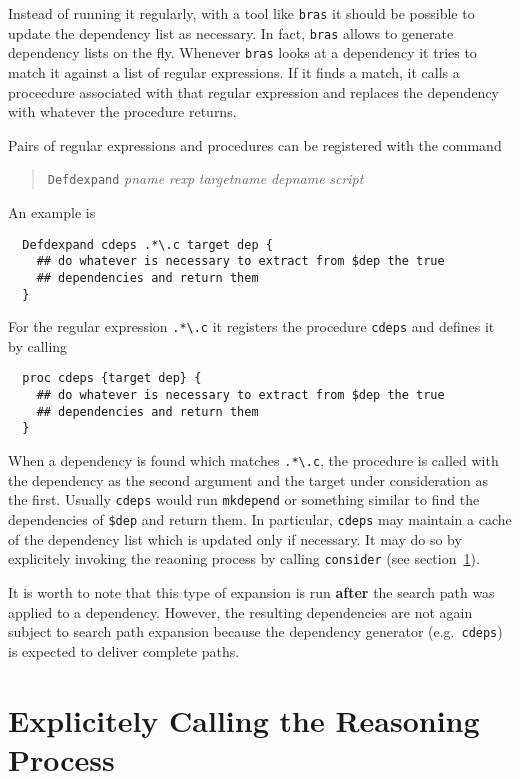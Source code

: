 \documentclass[12pt]{article}
\newcommand{\bras}{\texttt{bras}}
\begin{document}
Instead of running it regularly, with a tool like \bras{} it should be
possible to update the dependency list as necessary. In fact, \bras{}
allows to generate dependency lists on the fly. Whenever \bras{} looks
at a dependency it tries to match it against a list of regular
expressions. If it finds a match, it calls a procecdure associated with
that regular expression and replaces the dependency with whatever the
procedure returns.

Pairs of regular expressions and procedures can be registered with the
command
\begin{quote}
  \texttt{Defdexpand} \textit{pname} \textit{rexp} \textit{targetname}
\textit{depname} \textit{script}
\end{quote}
An example is
\begin{verbatim}
  Defdexpand cdeps .*\.c target dep {
    ## do whatever is necessary to extract from $dep the true
    ## dependencies and return them
  }
\end{verbatim}
For the regular expression \verb|.*\.c| it registers the procedure
\texttt{cdeps} and defines it by calling
\begin{verbatim}
  proc cdeps {target dep} {
    ## do whatever is necessary to extract from $dep the true
    ## dependencies and return them
  }
\end{verbatim}
When a dependency is found which matches \verb|.*\.c|, the procedure
is called with the dependency as the second argument and the target
under consideration as the first.  Usually \texttt{cdeps} would run
\texttt{mkdepend} or something similar to find the dependencies of
\texttt{\$dep} and return them. In particular, \texttt{cdeps} may
maintain a cache of the dependency list which is updated only if
necessary. It may do so by explicitely invoking the reaoning process
by calling \texttt{consider} (see section~\ref{secConsider}).

It is worth to note that this type of expansion is run \textbf{after}
the search path was applied to a dependency. However, the resulting
dependencies are not again subject to search path expansion because
the dependency generator (e.g.\ \texttt{cdeps}) is expected to deliver
complete paths.

\section{Explicitely Calling the Reasoning Process}
\label{secConsider}
\end{document}
